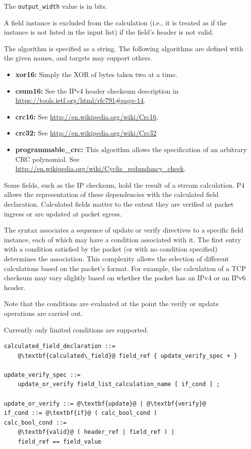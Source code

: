 \documentclass[12pt]{article}
\begin{document}
The \texttt{output_width} value is in bits.

A field instance is excluded from the calculation (i.e., it is treated as 
if the instance is not listed in the input list) if the field's header 
is not valid.

The algorithm is specified as a string.  The following algorithms are
defined with the given names, and targets may support others.

\begin{itemize}
\item
\textbf{xor16:} Simply the XOR of bytes taken two at a time.
\item
\textbf{csum16:}  See the IPv4 header checksum description in \\
\url{https://tools.ietf.org/html/rfc791\#page-14}.
\item
\textbf{crc16:} See \url{http://en.wikipedia.org/wiki/Crc16}.
\item
\textbf{crc32:} See \url{http://en.wikipedia.org/wiki/Crc32}
\item
\textbf{programmable_crc:}  This algorithm allows the specification 
of an arbitrary CRC polynomial.  See
\url{http://en.wikipedia.org/wiki/Cyclic_redundancy_check}.
\end{itemize}


Some fields, such as the IP checksum, hold the result of a stream
calculation.  P4 allows the representation of these dependencies with
the calculated field declaration. Calculated fields matter to the
extent they are verified at packet ingress or are updated at packet
egress.

The syntax associates a sequence of update or verify directives to a
specific field instance, each of which may have a condition associated
with it. The first entry with a condition satisfied by the packet (or
with no condition specified) determines the association. This
complexity allows the selection of different calculations based on the
packet's format. For example, the calculation of a TCP checksum may
vary slightly based on whether the packet has an IPv4 or an IPv6
header.

Note that the conditions are evaluated at the point the verify or
update operations are carried out.

Currently only limited conditions are supported.

\begin{lstlisting}[frame=single,backgroundcolor=\color{bnfgreen},escapechar=\@]
calculated_field_declaration ::=
    @\textbf{calculated\_field}@ field_ref { update_verify_spec + }

update_verify_spec ::=
    update_or_verify field_list_calculation_name [ if_cond ] ;

update_or_verify ::= @\textbf{update}@ | @\textbf{verify}@
if_cond ::= @\textbf{if}@ ( calc_bool_cond )
calc_bool_cond ::=
    @\textbf{valid}@ ( header_ref | field_ref ) |
    field_ref == field_value
\end{lstlisting}
\end{document}
